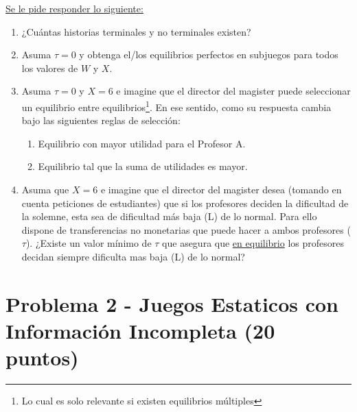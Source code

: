 \documentclass[11pt]{article}
\begin{document}
\underline{Se le pide responder lo siguiente:}
\begin{enumerate}
	\item ¿Cu\'antas historias terminales y no terminales existen?
	\item Asuma $\tau = 0$ y obtenga el/los equilibrios perfectos en subjuegos para todos los valores de $W$ y $X$.
	\item Asuma $\tau = 0$ y $X=6$ e imagine que el director del magister puede seleccionar un equilibrio entre equilibrios\footnote{Lo cual es solo relevante si existen equilibrios m\'ultiples}. En ese sentido, como su respuesta cambia bajo las siguientes reglas de selecci\'on:
	\begin{enumerate}
		\item Equilibrio con mayor utilidad para el Profesor A.
		\item Equilibrio tal que la suma de utilidades es mayor.
	\end{enumerate}
	\item Asuma que $X=6$ e imagine que el director del magister desea (tomando en cuenta peticiones de estudiantes) que si los profesores deciden la dificultad de la solemne, esta sea de dificultad m\'as baja (L) de lo normal. Para ello dispone de transferencias no monetarias que puede hacer a ambos profesores ($\tau$). ¿Existe un valor m\'inimo de $\tau$ que asegura que \underline{en equilibrio} los profesores decidan siempre dificulta mas baja (L) de lo normal?
\end{enumerate}

\section*{Problema 2 - Juegos Estaticos con Informaci\'on Incompleta (20 puntos)}
\end{document}
